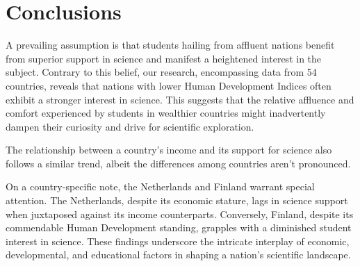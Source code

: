 \documentclass[12pt]{article}
\begin{document}
\section{Conclusions}

A prevailing assumption is that students hailing from affluent nations benefit from superior support in science and manifest a heightened interest in the subject. Contrary to this belief, our research, encompassing data from 54 countries, reveals that nations with lower Human Development Indices often exhibit a stronger interest in science. This suggests that the relative affluence and comfort experienced by students in wealthier countries might inadvertently dampen their curiosity and drive for scientific exploration.

The relationship between a country's income and its support for science also follows a similar trend, albeit the differences among countries aren't pronounced.

On a country-specific note, the Netherlands and Finland warrant special attention. The Netherlands, despite its economic stature, lags in science support when juxtaposed against its income counterparts. Conversely, Finland, despite its commendable Human Development standing, grapples with a diminished student interest in science. These findings underscore the intricate interplay of economic, developmental, and educational factors in shaping a nation's scientific landscape.

\newpage
%
%

 
\end{document}
